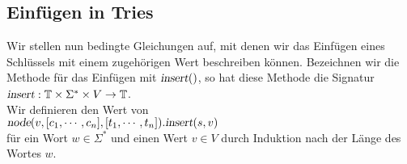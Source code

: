 \subsection{Einf\"ugen in Tries}
Wir stellen nun bedingte Gleichungen auf, mit denen wir das Einf\"ugen eines Schl\"ussels mit
einem zugeh\"origen Wert beschreiben k\"onnen.  Bezeichnen wir die Methode f\"ur das Einf\"ugen
mit $\textsl{insert}()$, so hat diese Methode die Signatur
\\[0.2cm]
\hspace*{1.3cm}
$\textsl{insert}: \mathbb{T} \times \Sigma^* \times V \rightarrow \mathbb{T}$.
\\[0.2cm]
Wir definieren den Wert von \\[0.2cm]
\hspace*{1.3cm} $\textsl{node}(v, [c_1, \cdots, c_n], [t_1, \cdots, t_n]).\textsl{insert}(s,v)$\\[0.2cm]
f\"ur ein Wort $w\in \Sigma^*$ und einen Wert $v \in V$
durch Induktion nach der L\"ange des Wortes $w$.
